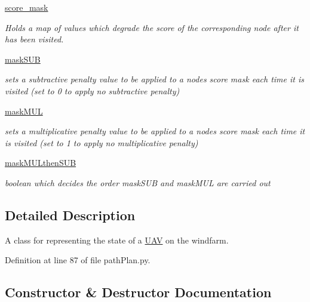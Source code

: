\begin{DoxyCompactItemize}
\mbox{\hyperlink{classpath_plan_1_1_u_a_v_a998af53f0d27f93e5ad949a09710f995}{score\+\_\+mask}}
\begin{DoxyCompactList}\small\item\em Holds a map of values which degrade the score of the corresponding node after it has been visited. \end{DoxyCompactList}\item 
\mbox{\hyperlink{classpath_plan_1_1_u_a_v_a74225919230caef7abcd27e5dfcb1f7e}{mask\+S\+UB}}
\begin{DoxyCompactList}\small\item\em sets a subtractive penalty value to be applied to a node\textquotesingle{}s score mask each time it is visited (set to 0 to apply no subtractive penalty) \end{DoxyCompactList}\item 
\mbox{\hyperlink{classpath_plan_1_1_u_a_v_ad5c1ef816da92a394a4e6bc1f0ebac62}{mask\+M\+UL}}
\begin{DoxyCompactList}\small\item\em sets a multiplicative penalty value to be applied to a node\textquotesingle{}s score mask each time it is visited (set to 1 to apply no multiplicative penalty) \end{DoxyCompactList}\item 
\mbox{\hyperlink{classpath_plan_1_1_u_a_v_aba8b84c7dde1938e44f23dbf9955b207}{mask\+M\+U\+Lthen\+S\+UB}}
\begin{DoxyCompactList}\small\item\em boolean which decides the order mask\+S\+UB and mask\+M\+UL are carried out \end{DoxyCompactList}\end{DoxyCompactItemize}


\subsection{Detailed Description}
A class for representing the state of a \mbox{\hyperlink{classpath_plan_1_1_u_a_v}{U\+AV}} on the windfarm. 

Definition at line 87 of file path\+Plan.\+py.



\subsection{Constructor \& Destructor Documentation}
\mbox{\label{classpath_plan_1_1_u_a_v_a57ea529b1f8160c59ac6d3ba1b677c37}} 
